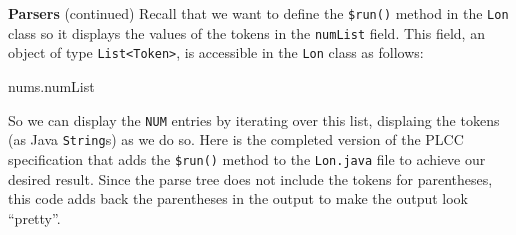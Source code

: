 \begin{minipage}[t]{\sw}
\slidenumber
\LARGE
{\bf Parsers} (continued)\exx
{\Large
\emm\LightBox{\MYlonGrammarKleene}\exx
}
Recall that we want to define the \verb'$run()' method
in the \verb'Lon' class
so it displays the values of the tokens in the \verb'numList' field.
This field, an object of type \verb'List<Token>',
is accessible in the  \verb'Lon' class as follows:
{\Large
\begin{qv}
nums.numList
\end{qv}
}
So we can display the \verb'NUM' entries by iterating over this list,
displaing the tokens (as Java \verb'String's) as we do so.
Here is the completed version of the PLCC specification
that adds the \verb'$run()' method to the \verb'Lon.java' file
to achieve our desired result.
Since the parse tree does not include the tokens for parentheses,
this code adds back the parentheses in the output
to make the output look ``pretty''.
{\Large
{}
}
\end{minipage}
\clearpage
